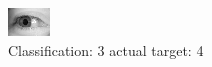 \begin{figure}[h!]
\begin{center}
\includegraphics[width=0.60\columnwidth]{figures/ID3130_class_3_target_4.png}
\end{center}
\caption{ Classification: 3 actual target: 4}
\label{fig:ID3130_class_3_target_4}
\end{figure}
